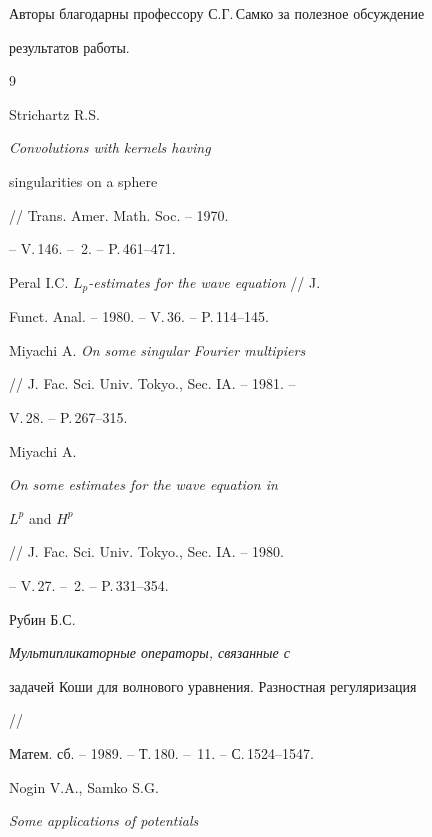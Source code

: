 Авторы благодарны профессору С.Г.\,Самко за полезное обсуждение


результатов работы.





\begin{thebibliography}{9}







Strichartz R.S. {\em Convolutions with kernels having


singularities on a sphere} // Trans. Amer. Math. Soc. -- 1970.


-- V.\,146. -- \No\,2. -- P.\,461--471.







Peral I.C. {\em $L_p$-estimates for the wave equation} // J.


Funct. Anal. -- 1980. -- V.\,36. -- P.\,114--145.







Miyachi A. {\em On some singular Fourier multipiers}


// J. Fac. Sci. Univ. Tokyo.,  Sec. IA. -- 1981. --


V.\,28. -- P.\,267--315.







Miyachi A. {\em On some estimates for the wave equation in


$L^p$ and $H^p$} // J. Fac. Sci. Univ. Tokyo., Sec. IA. -- 1980.


-- V.\,27. -- \No\,2. -- P.\,331--354.







Рубин Б.С. {\em Мультипликаторные операторы, связанные с


задачей Коши для волнового уравнения. Разностная регуляризация} //


Матем. сб. -- 1989. -- Т.\,180. -- \No\,11. -- С.\,1524--1547.







Nogin V.A., Samko S.G. {\em Some applications of potentials


}
\end{thebibliography}
